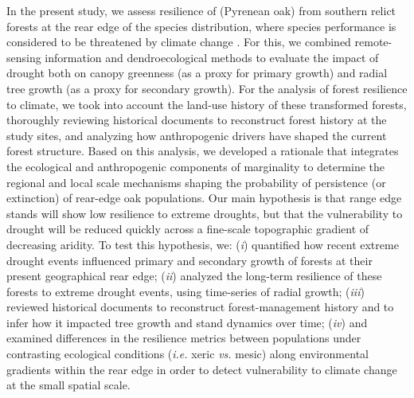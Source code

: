 In the present study, we assess resilience of \Qpy (Pyrenean oak) from southern relict forests at the rear edge of the species distribution, where species performance is considered to be threatened by climate change \autocite{GeaIzquierdoetal2013GrowthProjections,GeaIzquierdoetal2017RiskyFuture}. For this, we combined remote-sensing information and dendroecological methods to evaluate the impact of drought both on canopy greenness (as a proxy for primary growth) and radial tree growth (as a proxy for secondary growth). For the analysis of forest resilience to climate, we took into account the land-use history of these transformed forests, thoroughly reviewing historical documents to reconstruct forest history at the study sites, and analyzing how anthropogenic drivers have shaped the current forest structure. Based on this analysis, we developed a rationale that integrates the ecological and anthropogenic components of marginality to determine the regional and local scale mechanisms shaping the probability of persistence (or extinction) of rear-edge oak populations. Our main hypothesis is that range edge stands will show low resilience to extreme droughts, but that the vulnerability to drought will be reduced quickly across a fine-scale topographic gradient of decreasing aridity. To test this hypothesis, we: (\emph{i}) quantified how recent extreme drought events influenced primary and secondary growth of \Qp forests at their present geographical rear edge; (\emph{ii}) analyzed the long-term resilience of these forests to extreme drought events, using time-series of radial growth; (\emph{iii}) reviewed historical documents to reconstruct forest-management history and to infer how it impacted tree growth and stand dynamics over time; (\emph{iv}) and examined differences in the resilience metrics between populations under contrasting ecological conditions (\emph{i.e.} xeric \emph{vs.} mesic) along environmental gradients within the rear edge in order to detect vulnerability to climate change at the small spatial scale.

